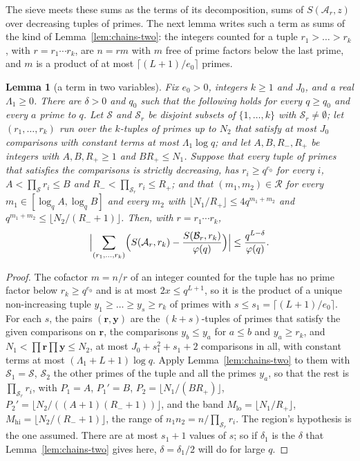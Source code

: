 \documentclass[11pt]{article}
\newtheorem{lemma}[theorem]{Lemma}
\theoremstyle{definition}
\begin{document}
The sieve meets these sums as the terms of its decomposition, sums of $S(\mathcal A_r, z)$ over decreasing tuples of
primes. The next lemma writes such a term as sums of the kind of Lemma~\ref{lem:chains-two}: the integers counted for a
tuple $r_1 > \dots > r_k$, with $r = r_1 \cdots r_k$, are $n = rm$ with $m$ free of prime factors below the last prime,
and $m$ is a product of at most $\lceil (L + 1)/e_0 \rceil$ primes.

\begin{lemma}[a term in two variables]\label{lem:term-two}
Fix $e_0 > 0$, integers $k \ge 1$ and $J_0$, and a real $\Lambda_1 \ge 0$. There are $\delta > 0$ and $q_0$ such that the
following holds for every $q \ge q_0$ and every $a$ prime to $q$. Let $\mathcal S$ and $\mathcal S_r$ be disjoint
subsets of $\{1, \dots, k\}$ with $\mathcal S_r \ne \emptyset$; let $(r_1, \dots, r_k)$ run over the $k$-tuples of
primes up to $N_2$ that satisfy at most $J_0$ comparisons with constant terms at most $\Lambda_1 \log q$; and let $A,
B, R_-, R_+$ be integers with $A, B, R_+ \ge 1$ and $B R_+ \le N_1$. Suppose that every tuple of primes that satisfies
the comparisons is strictly decreasing, has $r_i \ge q^{e_0}$ for every $i$, $A < \prod_{\mathcal S} r_i \le B$ and
$R_- < \prod_{\mathcal S_r} r_i \le R_+$; and that $(m_1, m_2) \in \mathcal R$ for every $m_1 \in [\log_q A, \log_q B]$
and every $m_2$ with $\lfloor N_1/R_+ \rfloor \le 4q^{m_1 + m_2}$ and $q^{m_1 + m_2} \le \lfloor N_2/(R_- + 1)
\rfloor$. Then, with $r = r_1 \cdots r_k$,
\[
  \Bigl|\sum_{(r_1, \dots, r_k)} \Bigl(S(\mathcal A_r, r_k) - \frac{S(\mathcal B_r, r_k)}{\varphi(q)}\Bigr)\Bigr|
  \le \frac{q^{L - \delta}}{\varphi(q)}.
\]
\end{lemma}

\begin{proof}
The cofactor $m = n/r$ of an integer counted for the tuple has no prime factor below $r_k \ge q^{e_0}$ and is at most
$2x \le q^{L + 1}$, so it is the product of a unique non-increasing tuple $y_1 \ge \dots \ge y_s \ge r_k$ of primes with
$s \le s_1 = \lceil (L + 1)/e_0 \rceil$. For each $s$, the pairs $(\mathbf r, \mathbf y)$ are the $(k + s)$-tuples of
primes that satisfy the given comparisons on $\mathbf r$, the comparisons $y_b \le y_a$ for $a \le b$ and $y_a \ge r_k$,
and $N_1 < \prod \mathbf r \prod \mathbf y \le N_2$, at most $J_0 + s_1^2 + s_1 + 2$ comparisons in all, with constant
terms at most $(\Lambda_1 + L + 1)\log q$. Apply Lemma~\ref{lem:chains-two} to them with $\mathcal S_1 = \mathcal S$,
$\mathcal S_2$ the other primes of the tuple and all the primes $y_a$, so that the rest is $\prod_{\mathcal S_r} r_i$,
with $P_1 = A$, $P_1' = B$, $P_2 = \lfloor N_1/(B R_+) \rfloor$, $P_2' = \lfloor N_2/((A + 1)(R_- + 1)) \rfloor$, and
the band $M_{\mathrm{lo}} = \lfloor N_1/R_+ \rfloor$, $M_{\mathrm{hi}} = \lfloor N_2/(R_- + 1) \rfloor$, the range of
$n_1 n_2 = n/\prod_{\mathcal S_r} r_i$. The region's hypothesis is the one assumed. There are at most $s_1 + 1$ values
of $s$; so if $\delta_1$ is the $\delta$ that Lemma~\ref{lem:chains-two} gives here, $\delta = \delta_1/2$ will do for
large $q$.
\end{proof}
\end{document}
